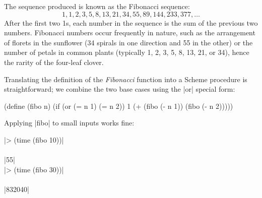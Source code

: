 \begin{schemeregion}
{%
The sequence produced is known as the Fibonacci sequence:
\begin{displaymath}
1, 1, 2, 3, 5, 8, 13, 21, 34, 55, 89, 144, 233, 377, \ldots
\end{displaymath}
After the first two 1s, each number in the sequence is the sum of the previous two numbers.  Fibonacci numbers occur frequently in nature, such as the arrangement of florets in the sunflower (34 spirals in one direction and 55 in the other) or the number of petals in common plants (typically 1, 2, 3, 5, 8, 13, 21, or 34), hence the rarity of the four-leaf clover.%


Translating the definition of the \emph{Fibonacci} function into a Scheme procedure is straightforward; we combine the two base cases using the \scheme|or| special form:
\begin{schemedisplay}
(define (fibo n)
  (if (or (= n 1) (= n 2)) 1
      (+ (fibo (- n 1)) (fibo (- n 2)))))
\end{schemedisplay}


Applying \scheme|fibo| to small inputs works fine:

\begin{code}
\scheme|> (time (fibo 10))|\\
\\
\schemeresult|55|\\
\scheme|> (time (fibo 30))|\\
\\
\schemeresult|832040|
\end{code}

}
\end{schemeregion}
